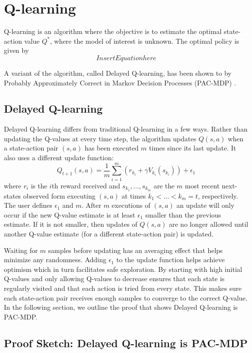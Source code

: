 \documentclass[10pt]{article}
\begin{document}
\section{Q-learning}
Q-learning is an algorithm where the objective is to estimate the optimal state-action value $Q^*$, where the model of interest is unknown. The optimal policy is given by
$$
Insert Equation here
$$

A variant of the algorithm, called Delayed Q-learning, has been shown to by Probably Approximately Correct in Markov Decision Processes (PAC-MDP) \cite{strehl_pac_2006}.
\subsection{Delayed Q-learning}
Delayed Q-learning differs from traditional Q-learning in a few ways.  Rather than updating the Q-values at every time step, the algorithm updates $Q(s,a)$ when a state-action pair $(s,a)$ has been executed $m$ times since its last update.  It also uses a different update function:
$$Q_{t+1}(s,a) = \frac{1}{m}\sum_{i=1}^m(r_{k_i}+\gamma V_{k_i}(s_{k_i})) + \epsilon_1$$  
where $r_i$ is the $i$th reward received and $s_{k_1},\dots,s_{k_m}$ are the $m$ most recent next-states observed form executing $(s,a)$ at times $k_1 < \dots < k_m = t$, respectively. The user defines $\epsilon_1$ and $m$.   
After $m$ executions of $(s,a)$ an update will only occur if the new Q-value estimate is at least $\epsilon_1$ smaller than the previous estimate.  If it is not smaller, then updates of $Q(s,a)$ are no longer allowed until another Q-value estimate (for a different state-action pair) is updated.

Waiting for $m$ samples before updating has an averaging effect that helps minimize any randomness. Adding $\epsilon_1$ to the update function helps achieve optimism which in turn facilitates safe exploration. By starting with high initial Q-values and only allowing Q-values to decrease ensures that each state is regularly visited and that each action is tried from every state.  This makes sure each state-action pair receives enough samples to converge to the correct Q-value.%
In the following section, we outline the proof that shows Delayed Q-learning is PAC-MDP.


\subsection{Proof Sketch: Delayed Q-learning is PAC-MDP}
\end{document}
